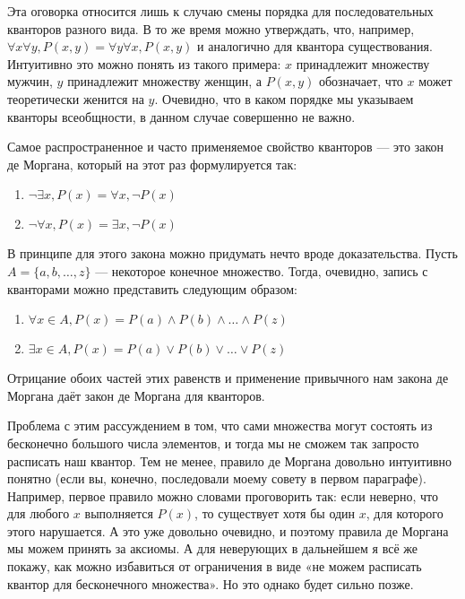 Эта оговорка относится лишь к случаю смены порядка для последовательных кванторов разного вида. В то же время можно утверждать, что, например, $\forall x \forall y, P(x, y) = \forall y \forall x, P(x, y)$ и аналогично для квантора существования. Интуитивно это можно понять из такого примера: $x$ принадлежит множеству мужчин, $y$ принадлежит множеству женщин, а $P(x, y)$ обозначает, что $x$ может теоретически женится на $y$. Очевидно, что в каком порядке мы указываем кванторы всеобщности, в данном случае совершенно не важно.

Самое распространенное и часто применяемое свойство кванторов — это закон де Моргана, который на этот раз формулируется так:

\begin{enumerate}
\item   $\neg \exists x, P(x) = \forall x, \neg P(x)$
\item   $\neg \forall x, P(x) = \exists x, \neg P(x)$
\end{enumerate}

В принципе для этого закона можно придумать нечто вроде доказательства. Пусть $A = \{a, b, \ldots, z\}$ — некоторое конечное множество. Тогда, очевидно, запись с кванторами можно представить  следующим образом:

\begin{enumerate}
\item   $\forall x \in A, P(x) = P(a) \wedge P(b) \wedge \ldots \wedge P(z)$
\item   $\exists x \in A, P(x) = P(a) \vee P(b) \vee \ldots \vee P(z)$
\end{enumerate}

Отрицание обоих частей этих равенств и применение привычного нам закона де Моргана даёт закон де Моргана для кванторов.

Проблема с этим рассуждением в том, что сами множества могут состоять из бесконечно большого числа элементов, и тогда мы не сможем так запросто расписать наш квантор. Тем не менее, правило де Моргана довольно интуитивно понятно (если вы, конечно, последовали моему совету в первом параграфе). Например, первое правило можно словами проговорить так: если неверно, что для любого $x$ выполняется $P(x)$, то существует хотя бы один $x$, для которого этого нарушается. А это уже довольно очевидно, и поэтому правила де Моргана мы можем принять за аксиомы. А для неверующих в дальнейшем я всё же покажу, как можно избавиться от ограничения в виде «не можем расписать квантор для бесконечного множества». Но это однако будет сильно позже.

